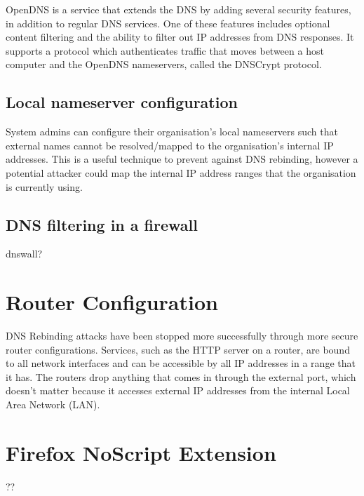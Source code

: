 OpenDNS is a service that extends the DNS by adding several security
features, in addition to regular DNS services. One of these features
includes optional content filtering and the ability to filter out
IP addresses from DNS responses. It supports a protocol which
authenticates traffic that moves between a host computer and the
OpenDNS nameservers, called the DNSCrypt protocol.

\subsection{Local nameserver configuration}

System admins can configure their organisation's local nameservers
such that external names cannot be resolved/mapped to the organisation's
internal IP addresses. This is a useful technique to prevent against
DNS rebinding, however a potential attacker could map the internal
IP address ranges that the organisation is currently using.

\subsection{DNS filtering in a firewall}

dnswall?

\section{Router Configuration}

DNS Rebinding attacks have been stopped more successfully through
more secure router configurations. Services, such as the HTTP server
on a router, are bound to all network interfaces and can be accessible
by all IP addresses in a range that it has. The routers drop anything
that comes in through the external port, which doesn't matter because
it accesses external IP addresses from the internal Local Area Network (LAN).

\section{Firefox NoScript Extension}

??
